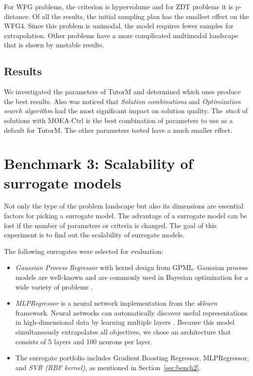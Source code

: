     
    For WFG problems, the criterion is hypervolume and for ZDT problems it is p-distance. Of all the results, the initial sampling plan has the smallest effect on the WFG4. Since this problem is unimodal, the model requires fewer samples for extrapolation. Other problems have a more complicated multimodal landscape that is shown by unstable results. 


    \subsection*{Results}
    We investigated the parameters of TutorM and determined which ones produce the best results. Also was noticed that \emph{Solution combinations} and \emph{Optimization search algorithm} had the most significant impact on solution quality. The \emph{stack} of solutions with MOEA-Ctrl is the best combination of parameters to use as a default for TutorM. 
    The other parameters tested have a much smaller effect.


\section{Benchmark 3: Scalability of surrogate models}
    Not only the type of the problem landscape but also its dimensions are essential factors for picking a surrogate model. The advantage of a surrogate model can be lost if the number of parameters or criteria is changed. The goal of this experiment is to find out the scalability of surrogate models.  

    The following surrogates were selected for evaluation:
    \begin{itemize}
        \item \emph{Gaussian Process Regressor} with kernel design from GPML\cite{RasmussenN10}. Gaussian process models are well-known and are commonly used in Bayesian optimization for a wide variety of problems \cite{EmmerichGN06, MlakarPTF15}. 
        \item \emph{MLPRegressor} is a neural network implementation from the \textit{sklearn} framework. Neural networks can automatically discover useful representations in high-dimensional data by learning multiple layers \cite{WilsonHSX16}. Because this model simultaneously extrapolates all objectives, we chose an architecture that consists of 5 layers and 100 neurons per layer.
        \item The surrogate portfolio includes Gradient Boosting Regressor, MLPRegressor, and \emph{SVR (RBF kernel)}, as mentioned in Section~\ref{sec:bench2}.
    \end{itemize}


